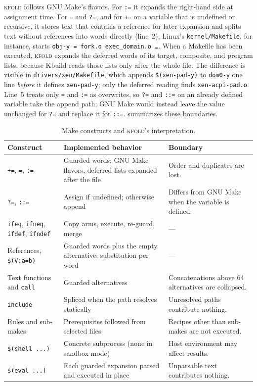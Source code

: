 \documentclass[acmsmall,screen,review]{acmart}
\newcommand{\tool}{\textsc{kfold}\xspace}
\begin{document}
\tool follows GNU Make's flavors. For \texttt{:=} it expands the right-hand side at assignment time. For \texttt{=} and \texttt{?=}, and for \texttt{+=} on a variable that is undefined or recursive, it stores text that contains a reference for later expansion and splits text without references into words directly (line~2); Linux's \texttt{kernel/Makefile}, for instance, starts \texttt{obj-y = fork.o exec\_domain.o \ldots}. When a Makefile has been executed, \tool expands the deferred words of its target, composite, and program lists, because Kbuild reads those lists only after the whole file. The difference is visible in \texttt{drivers/xen/Makefile}, which appends \texttt{\$(xen-pad-y)} to \texttt{dom0-y} one line \emph{before} it defines \texttt{xen-pad-y}; only the deferred reading finds \texttt{xen-acpi-pad.o}. Line~5 treats only \texttt{=} and \texttt{:=} as overwrites, so \texttt{?=} and \texttt{::=} on an already defined variable take the append path; GNU Make would instead leave the value unchanged for \texttt{?=} and replace it for \texttt{::=}.  summarizes these boundaries.

\begin{table}[t]
\centering\footnotesize
\caption{Make constructs and \tool's interpretation.}
\label{tab:scope}
\begin{tabular}{p{27mm}p{47mm}p{50mm}}
\toprule
Construct & Implemented behavior & Boundary \\
\midrule
\texttt{+=}, \texttt{=}, \texttt{:=} & Guarded words; GNU Make flavors, deferred lists expanded after the file & Order and duplicates are lost. \\
\texttt{?=}, \texttt{::=} & Assign if undefined; otherwise append & Differs from GNU Make when the variable is defined. \\
\texttt{ifeq}, \texttt{ifneq}, \texttt{ifdef}, \texttt{ifndef} & Copy arms, execute, re-guard, merge & --- \\
References, \texttt{\$(V:a=b)} & Guarded words plus the empty alternative; substitution per word & --- \\
Text functions and \texttt{call} & Guarded alternatives & Concatenations above 64 alternatives are collapsed. \\
\texttt{include} & Spliced when the path resolves statically & Unresolved paths contribute nothing. \\
Rules and sub-makes & Prerequisites followed from selected files & Recipes other than sub-makes are not executed. \\
\texttt{\$(shell ...)} & Concrete subprocess (none in sandbox mode) & Host environment may affect results. \\
\texttt{\$(eval ...)} & Each guarded expansion parsed and executed in place & Unparsable text contributes nothing. \\
\bottomrule
\end{tabular}
\end{table}
\end{document}
